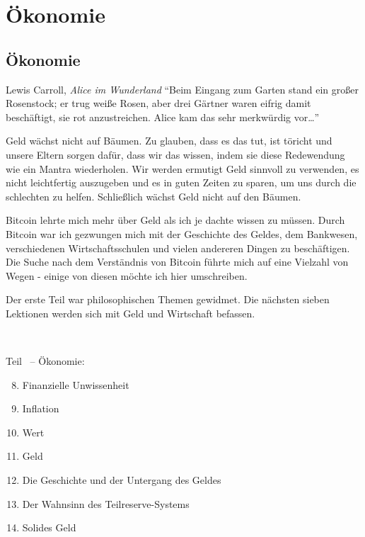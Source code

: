 \part{Ökonomie}
\label{ch:economics}
\chapter*{Ökonomie}

\begin{chapquote}{Lewis Carroll, \textit{Alice im Wunderland}}
\enquote{Beim Eingang zum Garten stand ein großer Rosenstock; er trug weiße
Rosen, aber drei Gärtner waren eifrig damit beschäftigt, sie rot anzustreichen.
Alice kam das sehr merkwürdig vor\ldots}
\end{chapquote}

Geld wächst nicht auf Bäumen. Zu glauben, dass es das tut, ist töricht und
unsere Eltern sorgen dafür, dass wir das wissen, indem sie diese Redewendung wie
ein Mantra wiederholen. Wir werden ermutigt Geld sinnvoll zu verwenden, es nicht
leichtfertig auszugeben und es in guten Zeiten zu sparen, um uns durch die
schlechten zu helfen. Schließlich wächst Geld nicht auf den Bäumen.

Bitcoin lehrte mich mehr über Geld als ich je dachte wissen zu müssen. Durch
Bitcoin war ich gezwungen mich mit der Geschichte des Geldes, dem Bankwesen,
verschiedenen Wirtschaftsschulen und vielen andereren Dingen zu beschäftigen.
Die Suche nach dem Verständnis von Bitcoin führte mich auf eine Vielzahl von
Wegen - einige von diesen möchte ich hier umschreiben.

Der erste Teil war philosophischen Themen gewidmet. Die nächsten sieben
Lektionen werden sich mit Geld und Wirtschaft befassen.

~

\begin{samepage}
Teil~\ref{ch:economics} -- Ökonomie:

\begin{enumerate}
  \setcounter{enumi}{7}
  \item Finanzielle Unwissenheit
  \item Inflation
  \item Wert
  \item Geld
  \item Die Geschichte und der Untergang des Geldes
  \item Der Wahnsinn des Teilreserve-Systems
  \item Solides Geld
\end{enumerate}
\end{samepage}

